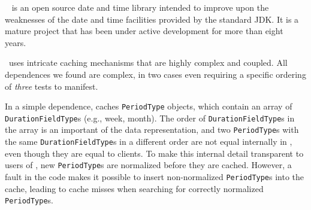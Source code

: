 \newcommand{\periodType}{\texttt{Period\-Type}}
\newcommand{\durationFieldType}{\texttt{Duration\-Field\-Type}}
\newcommand{\forFields}{\texttt{for\-Fields}}

\jodatime{}~\cite{jodatime} is an open source
date and time library intended to improve upon the weaknesses of the
date and time facilities provided by the standard JDK.
It is a mature project that has been under active development
for more than eight years.

\jodatime\ uses intricate caching mechanisms that are high\-ly complex
and coupled.  All dependences we found are complex,
in two cases even requiring a
specific ordering of \emph{three} tests to manifest.

In a simple dependence, \jodatime{} caches \periodType{} objects, which 
contain an array of
\durationFieldType{}s (e.g., week, month). 
The order of \durationFieldType{}s in the array is an
important of the data representation, and 
two \periodType{}s with the same \durationFieldType{}s in a different
order are not equal internally in \jodatime, even though they are equal
to \jodatime clients.
To make this internal detail transparent to users of \jodatime, 
new \periodType{}s are normalized before they are cached. However, a fault in the code 
makes it possible to insert non-normalized \periodType{}s into the
cache, leading to cache misses when searching for correctly normalized
\periodType{}s.


